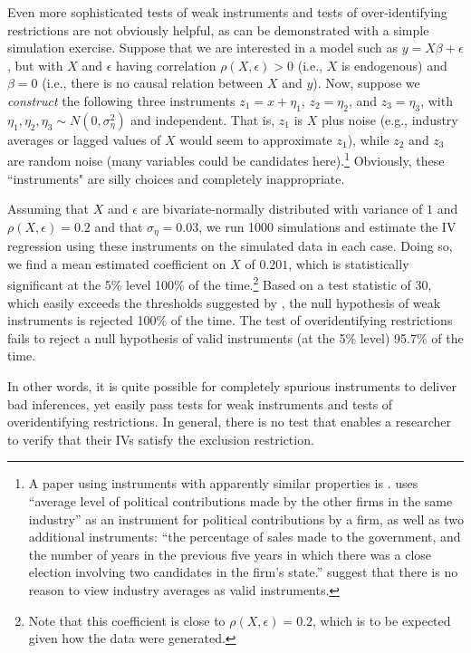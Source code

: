 \documentclass[11pt,reqno,titlepage]{amsart}
\begin{document}
\begin{doublespace}
Even more sophisticated tests of weak instruments and tests of over-identifying restrictions are not obviously helpful, as can be demonstrated with a simple simulation exercise.
Suppose that we are interested in a model such as $y = X \beta + \epsilon$, but with $X$ and $\epsilon$ having correlation $\rho(X, \epsilon) > 0$ (i.e., $X$ is endogenous) and $\beta = 0$ (i.e., there is no causal relation between $X$ and $y$). 
Now, suppose we \emph{construct} the following three instruments 
$z_1 = x +\eta_1$, $z_2 = \eta_2$, and $z_3 = \eta_3$, with $\eta_1, \eta_2,  \eta_3 \sim N(0, \sigma_{\eta}^2)$ and independent. 
That is, $z_1$ is $X$ plus noise (e.g., industry averages or lagged values of $X$ would seem to approximate $z_1$), while $z_2$ and $z_3$ are random noise (many variables could be candidates here).\footnote{A paper using instruments with apparently similar properties is \citet{Correia:2014fp}. 
\citet{Correia:2014fp} uses ``average level of political contributions made by the other firms in the same industry'' as an instrument for political contributions by a firm, as well as two additional instruments: ``the percentage of sales made to the government, and the number of years in the previous five years in which there was a close election involving two candidates in the firm's state.''  \citet{Reiss:2007ej} suggest that there is no reason to view industry averages as valid instruments.}
Obviously, these ``instruments" are silly choices and completely inappropriate.

Assuming that $X$ and $\epsilon$ are bivariate-normally distributed with variance of $1$ and $\rho(X, \epsilon)=0.2$ and that $\sigma_{\eta}=0.03$, we run 1000 simulations and  estimate the IV regression using these instruments on the simulated data in each case.
Doing so, we find a mean estimated coefficient on $X$ of $0.201$, which is statistically significant at the 5\% level 100\% of the time.\footnote{Note that this coefficient is close to $\rho(X, \epsilon) = 0.2$, which is to be expected given how the data were generated.} 
Based on a test statistic of 30, which easily exceeds the thresholds suggested by \citet{Stock:2002aa}, the null hypothesis of weak instruments is rejected 100\% of the time. 
The test of overidentifying restrictions fails to reject a null hypothesis of valid instruments (at the 5\% level) 95.7\% of the time.

In other words, it is quite possible for completely spurious instruments to deliver bad inferences, yet easily pass tests for weak instruments and tests of overidentifying restrictions.
In general, there is no test that enables a researcher to verify that their IVs satisfy the exclusion restriction.


\end{doublespace}
\end{document}
